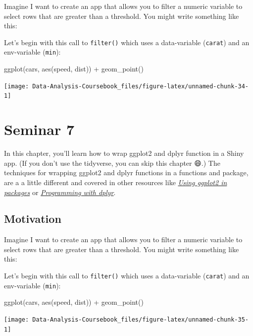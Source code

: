 \documentclass[
]{article}
\newenvironment{Shaded}{\begin{snugshade}}{\end{snugshade}}
\newcommand{\FunctionTok}[1]{\textcolor[rgb]{0.00,0.00,0.00}{#1}}
\newcommand{\NormalTok}[1]{#1}
\newcommand{\SpecialCharTok}[1]{\textcolor[rgb]{0.00,0.00,0.00}{#1}}
\begin{document}
Imagine I want to create an app that allows you to filter a numeric variable to select rows that are greater than a threshold.
You might write something like this:

Let's begin with this call to \texttt{filter()} which uses a data-variable (\texttt{carat}) and an env-variable (\texttt{min}):

\begin{Shaded}
\begin{Highlighting}[]
\FunctionTok{ggplot}\NormalTok{(cars, }\FunctionTok{aes}\NormalTok{(speed, dist)) }\SpecialCharTok{+} 
  \FunctionTok{geom\_point}\NormalTok{()}
\end{Highlighting}
\end{Shaded}

\begin{center}\texttt{[image: Data-Analysis-Coursebook\_files/figure-latex/unnamed-chunk-34-1]} \end{center}

\hypertarget{seminar7}{%
\section{Seminar 7}\label{seminar7}}

In this chapter, you'll learn how to wrap ggplot2 and dplyr function in a Shiny app.
(If you don't use the tidyverse, you can skip this chapter 😄.) The techniques for wrapping ggplot2 and dplyr functions in a functions and package, are a a little different and covered in other resources like \href{http://ggplot2.tidyverse.org/dev/articles/ggplot2-in-packages.html}{\emph{Using ggplot2 in packages}} or \href{http://dplyr.tidyverse.org/articles/programming.html}{\emph{Programming with dplyr}}.

\hypertarget{tidy-motivation}{%
\subsection{Motivation}\label{tidy-motivation}}

Imagine I want to create an app that allows you to filter a numeric variable to select rows that are greater than a threshold.
You might write something like this:

Let's begin with this call to \texttt{filter()} which uses a data-variable (\texttt{carat}) and an env-variable (\texttt{min}):

\begin{Shaded}
\begin{Highlighting}[]
\FunctionTok{ggplot}\NormalTok{(cars, }\FunctionTok{aes}\NormalTok{(speed, dist)) }\SpecialCharTok{+} 
  \FunctionTok{geom\_point}\NormalTok{()}
\end{Highlighting}
\end{Shaded}

\begin{center}\texttt{[image: Data-Analysis-Coursebook\_files/figure-latex/unnamed-chunk-35-1]} \end{center}

  
\end{document}
